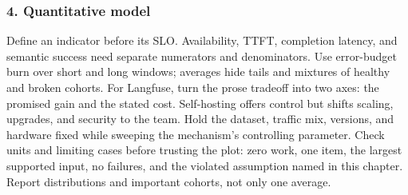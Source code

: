 \subsubsection*{4. Quantitative model}
Define an indicator before its SLO. Availability, TTFT, completion latency, and semantic success need separate numerators and denominators. Use error-budget burn over short and long windows; averages hide tails and mixtures of healthy and broken cohorts.
For Langfuse, turn the prose tradeoff into two axes: the promised gain and the stated cost. Self-hosting offers control but shifts scaling, upgrades, and security to the team. Hold the dataset, traffic mix, versions, and hardware fixed while sweeping the mechanism's controlling parameter.
Check units and limiting cases before trusting the plot: zero work, one item, the largest supported input, no failures, and the violated assumption named in this chapter. Report distributions and important cohorts, not only one average.
